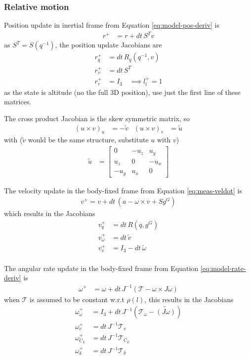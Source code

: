 \subsubsection{Relative motion}
Position update in inertial frame from Equation \ref{eq:model-pos-deriv}
is 
\begin{align}
    r^+ &= r + dt \, S^T v
\end{align}
as $S^T = S(q^{-1})$, the position update Jacobians are
\begin{align}
    r^+_q &= dt \, R_q(q^{-1},v) \\
    r^+_v &= dt \, S^T \\
    r^+_r &= I_3 \quad \implies l^+_l = 1
\end{align}
as the state is altitude (no the full 3D position), use just the first line of these matrices. 

The cross product Jacobian is the skew symmetric matrix, so 
\begin{align}
    (u \times v)_u &= - \tilde v 
    &
    (u \times v)_v &= \tilde u
\end{align}
with ($\tilde v$ would be the same structure, substitute $u$ with $v$)
\begin{align}
    \tilde u &= \begin{bmatrix}
        0 & -u_z & u_y \\ u_z & 0 & -u_x \\ -u_y & u_x & 0
    \end{bmatrix} 
\end{align}

The velocity update in the body-fixed frame from Equation \ref{eq:meas-veldot} is
\begin{align}
    v^+ = v + dt \, (a -\omega \times v + S g^G)
\end{align}
which results in the Jacobians
\begin{align}
    v^+_q &= dt \, R(q,g^G) \\
    v^+_\omega &= dt \, \tilde v \\
    v^+_v &= I_3 - dt \, \tilde \omega\\
\end{align}

The angular rate update in the body-fixed frame from Equation \ref{eq:model-rate-deriv} is
\begin{align}
   \omega^+ &= \omega + dt \, J^{-1} (\mathcal{T} - \omega \times J \omega)
\end{align}
when $\mathcal{T}$ is assumed to be constant w.r.t $\rho(l)$, this results in the Jacobians
\begin{align}
    \omega^+_\omega &= I_3 + dt \,  J^{-1} (\mathcal{T}_\omega - \tilde {(J \omega)} )  \\
    \omega^+_v &= dt \, J^{-1} \mathcal{T}_v \\
    \omega^+_{C_L} &= dt \, J^{-1} \mathcal{T}_{C_L} \\
    \omega^+_\delta &= dt \, J^{-1} \mathcal{T}_\delta
\end{align}


